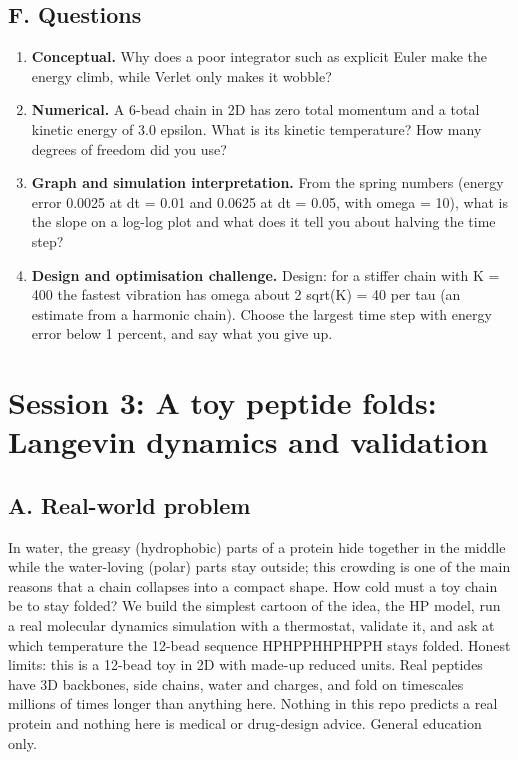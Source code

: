 \documentclass[11pt,a4paper]{article}
\begin{document}
\subsection*{F. Questions}
\begin{enumerate}[nosep]
\item \textbf{Conceptual.} Why does a poor integrator such as explicit Euler make the energy climb, while Verlet only makes it wobble?
\item \textbf{Numerical.} A 6-bead chain in 2D has zero total momentum and a total kinetic energy of 3.0 epsilon. What is its kinetic temperature? How many degrees of freedom did you use?
\item \textbf{Graph and simulation interpretation.} From the spring numbers (energy error 0.0025 at dt = 0.01 and 0.0625 at dt = 0.05, with omega = 10), what is the slope on a log-log plot and what does it tell you about halving the time step?
\item \textbf{Design and optimisation challenge.} Design: for a stiffer chain with K = 400 the fastest vibration has omega about 2 sqrt(K) = 40 per tau (an estimate from a harmonic chain). Choose the largest time step with energy error below 1 percent, and say what you give up.
\end{enumerate}

\section{Session 3: A toy peptide folds: Langevin dynamics and validation}

\subsection*{A. Real-world problem}
In water, the greasy (hydrophobic) parts of a protein hide together in the middle while the water-loving (polar) parts stay outside; this crowding is one of the main reasons that a chain collapses into a compact shape. How cold must a toy chain be to stay folded? We build the simplest cartoon of the idea, the HP model, run a real molecular dynamics simulation with a thermostat, validate it, and ask at which temperature the 12-bead sequence HPHPPHHPHPPH stays folded. Honest limits: this is a 12-bead toy in 2D with made-up reduced units. Real peptides have 3D backbones, side chains, water and charges, and fold on timescales millions of times longer than anything here. Nothing in this repo predicts a real protein and nothing here is medical or drug-design advice. General education only.
\end{document}
